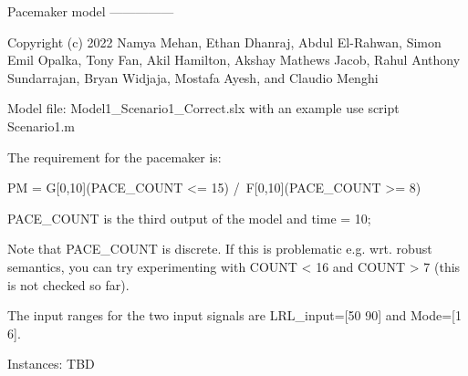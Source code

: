 Pacemaker model
---------------

Copyright (c) 2022
Namya Mehan, Ethan Dhanraj, Abdul El-Rahwan, Simon Emil Opalka, Tony Fan, Akil Hamilton, Akshay Mathews Jacob, Rahul Anthony Sundarrajan, Bryan Widjaja, Mostafa Ayesh, and Claudio Menghi

Model file: Model1_Scenario1_Correct.slx with an example use script Scenario1.m

The requirement for the pacemaker is:

PM = G[0,10](PACE_COUNT <= 15) /\ F[0,10](PACE_COUNT >= 8)

PACE_COUNT is the third output of the model and
time = 10;                  %

Note that PACE_COUNT is discrete. If this is problematic e.g. wrt. robust semantics,
you can try experimenting with COUNT < 16 and COUNT > 7 (this is not checked so far).

The input ranges for the two input signals are LRL_input=[50 90] and Mode=[1 6].

Instances: TBD
